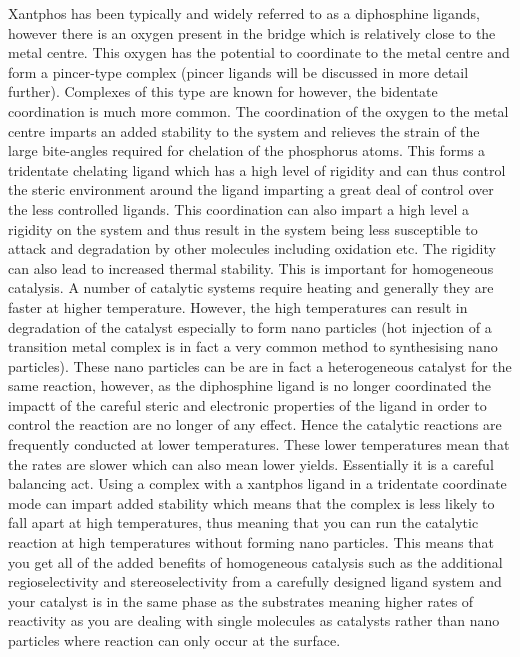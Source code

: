 Xantphos has been typically and widely referred to as a diphosphine ligands, however there is an oxygen present in the bridge which is relatively close to the metal centre.  This oxygen has the potential to coordinate to the metal centre and form a pincer-type complex (pincer ligands will be discussed in more detail further).  Complexes of this type are known for \Phxantphos{} however, the bidentate coordination is much more common.  The coordination of the oxygen to the metal centre imparts an added stability to the system and relieves the strain of the large bite-angles required for \trans{} chelation of the phosphorus atoms.  This forms a tridentate chelating ligand which has a high level of rigidity and can thus control the steric environment around the ligand imparting a great deal of control over the less controlled ligands.  This coordination can also impart a high level a rigidity on the system and thus result in the system being less susceptible to attack and degradation by other molecules including oxidation etc.  The rigidity can also lead to increased thermal stability.  This is important for homogeneous catalysis.  A number of catalytic systems require heating and generally they are faster at higher temperature.  However, the high temperatures can result in degradation of the catalyst especially to form nano particles (hot injection of a transition metal complex is in fact a very common method to synthesising nano particles).  These nano particles can be are in fact a heterogeneous catalyst for the same reaction, however, as the diphosphine ligand is no longer coordinated the impactt of the careful steric and electronic properties of the ligand in order to control the reaction are no longer of any effect.  Hence the catalytic reactions are frequently conducted at lower temperatures.  These lower temperatures mean that the rates are slower which can also mean lower yields.  Essentially it is a careful balancing act.  Using a complex with a xantphos ligand in a tridentate coordinate mode can impart added stability which means that the complex is less likely to fall apart at high temperatures, thus meaning that you can run the catalytic reaction at high temperatures without forming nano particles.  This means that you get all of the added benefits of homogeneous catalysis such as the additional regioselectivity and stereoselectivity from a carefully designed ligand system and your catalyst is in the same phase as the substrates meaning higher rates of reactivity as you are dealing with single molecules as catalysts rather than nano particles where reaction can only occur at the surface.  

